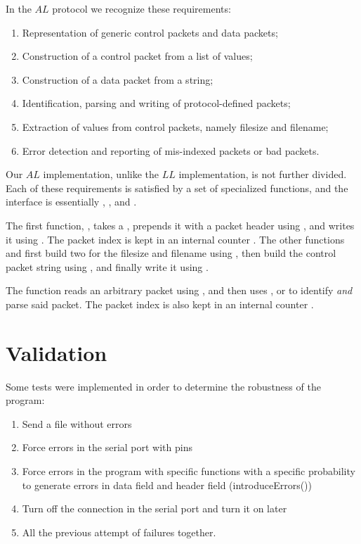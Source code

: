 \documentclass[main.tex]{subfiles}
\begin{document}
In the $AL$ protocol we recognize these requirements:

\begin{enumerate}[label=(\alph*),noitemsep,rightmargin=3em]
\item Representation of generic control packets and data packets;
\item Construction of a control packet from a list of values;
\item Construction of a data packet from a string;
\item Identification, parsing and writing of protocol-defined packets;
\item Extraction of  values from control packets, namely filesize and filename;
\item Error detection and reporting of mis-indexed \pDATA{} packets or bad packets.
\end{enumerate}

Our $AL$ implementation, unlike the $LL$ implementation, is not further divided.
Each of these requirements is satisfied by a set of specialized functions, and the interface is essentially , ,  and .

The first function, , takes a , prepends it with a packet header using , and writes it using .
The packet index is kept in an internal counter .
The other functions  and  first build two  for the filesize and filename using , then build the control packet string using , and finally write it using .

The  function reads an arbitrary packet using , and then uses ,  or  to identify \emph{and} parse said packet.
The packet index is also kept in an internal counter .

\section{Validation}
\label{sec:validation}

Some tests were implemented in order to determine the robustness of the program:
\begin{enumerate}[label=(\alph*),noitemsep,rightmargin=3em]
\item Send a file without errors
\item Force errors in the serial port with pins
\item Force errors in the program with specific functions with a specific probability to generate errors in data field and header field (introduceErrors())
\item Turn off the connection in the serial port and turn it on later
\item All the previous attempt of failures together.
\end{enumerate}
\end{document}
